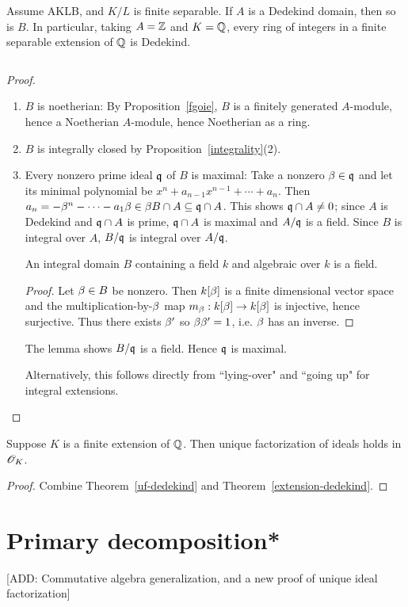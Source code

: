 \begin{thm}
Assume AKLB, and $K/L$ is finite separable. If $A$ is a Dedekind domain, then so is $B$. In particular, taking $A=\mathbb{Z}$ and $K=\mathbb{Q}$, every ring of integers in a finite separable extension of $\mathbb{Q}$ is Dedekind.
\end{thm}$\,$
\begin{proof}$\,$
\begin{enumerate}
\item $B$ is noetherian: By Proposition~\ref{fgoie}, $B$ is a finitely generated $A$-module, hence a Noetherian $A$-module, hence Noetherian as a ring.
\item $B$ is integrally closed by Proposition~\ref{integrality}(2).
\item Every nonzero prime ideal $\mathfrak{q}$ of $B$ is maximal: Take a nonzero $\beta\in \mathfrak{q}$ and let its minimal polynomial be $x^n+a_{n-1}x^{n-1}+\cdots +a_n$. Then $a_n=-\beta^n-\cdots -a_1\beta\in \beta B\cap A\subseteq \mathfrak{q}\cap A$. This shows $\mathfrak{q}\cap A\ne 0$; since $A$ is Dedekind and $\mathfrak{q}\cap A$ is prime, $\mathfrak{q}\cap A$ is maximal and $A/\mathfrak{q}$ is a field. Since $B$ is integral over $A$, $B/\mathfrak{q}$ is integral over $A/\mathfrak{q}$.
\begin{lem}
An integral domain $B$ containing a field $k$ and algebraic over $k$ is a field.
\end{lem}
\begin{proof}
Let $\beta\in B$ be nonzero. Then $k[\beta]$ is a finite dimensional vector space and the multiplication-by-$\beta$ map $m_{\beta}:k[\beta]\to k[\beta]$ is injective, hence surjective. Thus there exists $\beta'$ so $\beta\beta'=1$, i.e. $\beta$ has an inverse.
\end{proof}
The lemma shows $B/\mathfrak{q}$ is a field. Hence $\mathfrak{q}$ is maximal.

Alternatively, this follows directly from ``lying-over" and ``going up" for integral extensions.\qedhere
\end{enumerate}
\end{proof}
\begin{thm}
Suppose $K$ is a finite extension of $\mathbb{Q}$. Then unique factorization of ideals holds in $\mathscr{O}_K$. 
\end{thm}
\begin{proof}
Combine Theorem~\ref{uf-dedekind} and Theorem~\ref{extension-dedekind}.
\end{proof}
\section{Primary decomposition*}
[ADD: Commutative algebra generalization, and a new proof of unique ideal factorization]
